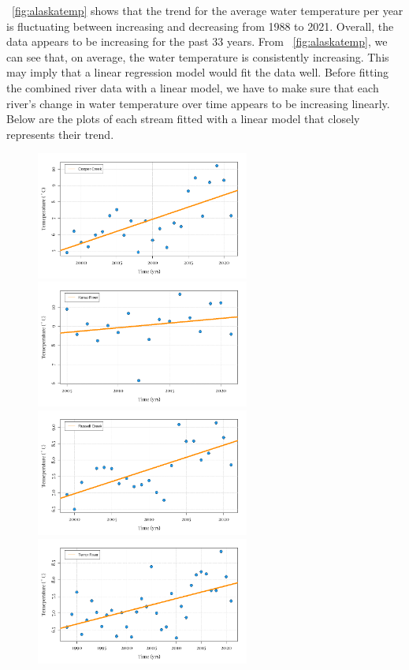 \figureautorefname~\ref{fig:alaskatemp} shows that the trend for the average water temperature per year is fluctuating between increasing and decreasing from 1988 to 2021.
Overall, the data appears to be increasing for the past 33 years.
From \figureautorefname~\ref{fig:alaskatemp}, we can see that, on average, the water temperature is consistently increasing.
This may imply that a linear regression model would fit the data well.
Before fitting the combined river data with a linear model, we have to make sure that each river's change in water temperature over time appears to be increasing linearly.
Below are the plots of each stream fitted with a linear model that closely represents their trend. 
\begin{figure}[H]
    \centering
    \includegraphics[width=7cm]{Pictures/SST/sst - cooper.png}
    \hfill
    \includegraphics[width=7cm]{Pictures/SST/sst - kenai river.png}
    \\
    \includegraphics[width=7cm]{Pictures/SST/sst - russell.png}
    \hfill
    \includegraphics[width=7cm]{Pictures/SST/sst - terror.png}
\end{figure}
